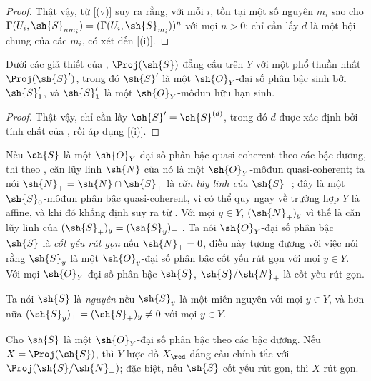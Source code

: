 \documentclass[oneside,10pt]{amsart}
\newcommand{\oldpage}[2][]{\marginnote{\normalfont\footnotesize\textbf{#1}~|~#2}\ignorespaces}
\let\EGAOriginalLabel\label
\renewcommand{\label}[1]{\phantomsection\EGAOriginalLabel{#1}}
\begin{document}
\begin{proof}
Thật vậy, từ [(v)] suy ra rằng, với mỗi $i$, tồn tại một số nguyên $m_i$ sao cho $\Gamma(U_i,\sh{S}_{nm_i})=(\Gamma(U_i,\sh{S}_{m_i}))^n$ với mọi $n>0$;
chỉ cần lấy $d$ là một bội chung của các $m_i$, có xét đến [(i)].
\end{proof}

\begin{corollary}[3.1.11]
\label{II.3.1.11}
Dưới các giả thiết của , $\Proj(\sh{S})$ đẳng cấu trên $Y$ với một phổ thuần nhất $\Proj(\sh{S}')$, trong đó $\sh{S}'$ là một $\sh{O}_Y$-đại số phân bậc sinh bởi $\sh{S}'_1$, và $\sh{S}'_1$ là một $\sh{O}_Y$-môđun hữu hạn sinh.
\end{corollary}

\begin{proof}
Thật vậy, chỉ cần lấy $\sh{S}'=\sh{S}^{(d)}$, trong đó $d$ được xác định bởi tính chất của , rồi áp dụng [(i)].
\end{proof}

\begin{env}[3.1.12]
\label{II.3.1.12}
Nếu $\sh{S}$ là một $\sh{O}_Y$-đại số phân bậc quasi-coherent theo các bậc dương, thì theo , căn lũy linh $\sh{N}$ của nó là một $\sh{O}_Y$-môđun quasi-coherent;
ta nói $\sh{N}_+=\sh{N}\cap\sh{S}_+$ là \emph{căn lũy linh của $\sh{S}_+$};
đây là một $\sh{S}_0$-môđun phân bậc quasi-coherent, vì có thể quy ngay về trường hợp $Y$ là affine, và khi đó khẳng định suy ra từ .
Với mọi $y\in Y$, $(\sh{N}_+)_y$ vì thế là căn lũy linh của $(\sh{S}_+)_y=(\sh{S}_y)_+$ .
Ta nói $\sh{O}_Y$-đại số phân bậc $\sh{S}$ là \emph{cốt yếu rút gọn} nếu $\sh{N}_+=0$, điều này tương đương
\oldpage[II]{53}
với việc nói rằng $\sh{S}_y$ là một $\sh{O}_y$-đại số phân bậc cốt yếu rút gọn với mọi $y\in Y$.
Với mọi $\sh{O}_Y$-đại số phân bậc $\sh{S}$, $\sh{S}/\sh{N}_+$ là cốt yếu rút gọn.

Ta nói $\sh{S}$ là \emph{nguyên} nếu $\sh{S}_y$ là một miền nguyên với mọi $y\in Y$, và hơn nữa $(\sh{S}_y)_+=(\sh{S}_+)_y\neq0$ với mọi $y\in Y$.
\end{env}

\begin{proposition}[3.1.13]
\label{II.3.1.13}
Cho $\sh{S}$ là một $\sh{O}_Y$-đại số phân bậc theo các bậc dương.
Nếu $X=\Proj(\sh{S})$, thì $Y$-lược đồ $X_\red$ đẳng cấu chính tắc với $\Proj(\sh{S}/\sh{N}_+)$;
đặc biệt, nếu $\sh{S}$ cốt yếu rút gọn, thì $X$ rút gọn.
\end{proposition}
\end{document}
